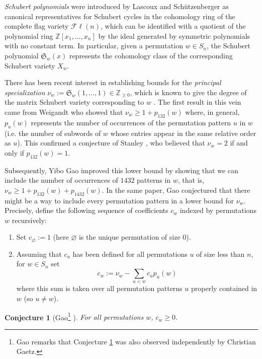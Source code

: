 \documentclass[11pt]{article}
\newtheorem{conjecture}[theo]{Conjecture}
\theoremstyle{definition}
\numberwithin{equation}{section}
\newcommand{\Z}{\mathbb{Z}}
\newcommand{\fk}{\mathfrak}
\begin{document}
\textit{Schubert polynomials} were introduced by Lascoux and Sch\"utzenberger \cite{LS82a} as canonical representatives for Schubert cycles in the cohomology ring of the complete flag variety $\mathcal{F}\ell(n)$, which can be identified with a quotient of the polynomial ring $\Z[x_1,\dots,x_n]$ by the ideal generated by symmetric polynomials with no constant term.
In particular, given a permutation $w\in S_n$, the Schubert polynomial $\fk S_w(x)$ represents the cohomology class of the corresponding Schubert variety $X_w$.

There has been recent interest in establishing bounds for the \textit{principal specialization} $\nu_w := \fk S_w(1,\dots,1) \in \Z_{\geq0}$, which is known to give the degree of the matrix Schubert variety corresponding to $w$ \cite{KM05}.
The first result in this vein came from Weigandt \cite{Wei18} who showed that $\nu_w \geq 1 + p_{132}(w)$ where, in general, $p_u(w)$ represents the number of occurrences of the permutation pattern $u$ in $w$ (i.e. the number of subwords of $w$ whose entries appear in the same relative order as $u$).
This confirmed a conjecture of Stanley \cite{Sta17}, who believed that $\nu_w = 2$ if and only if $p_{132}(w)=1$.

Subsequently, Yibo Gao \cite{Gao21} improved this lower bound by showing that we can include the number of occurrences of $1432$ patterns in $w$, that is, $\nu_w \geq 1 + p_{132}(w) + p_{1432}(w)$.
In the same paper, Gao conjectured that there might be a way to include every permutation pattern in a lower bound for $\nu_w$.
Precisely, define the following sequence of coefficients $c_w$ indexed by permutations $w$ recursively:
\begin{enumerate}
    \item Set $c_\varnothing := 1$ (here $\varnothing$ is the unique permutation of size $0$).
    \item Assuming that $c_u$ has been defined for all permutations $u$ of size less than $n$, for $w\in S_n$ set \[
        c_w := \nu_w - \sum_{u< w} c_up_u(w)
    \] where this sum is taken over all permutation patterns $u$ properly contained in $w$ (so $u\neq w$).
\end{enumerate}

\begin{conjecture}[Gao\footnote{
    Gao remarks that Conjecture \ref{conj:gao} was also observed independently by Christian Gaetz.
} \cite{Gao21}]
\label{conj:gao}
    For all permutations $w$, $c_w\geq 0$.
\end{conjecture}
\end{document}
